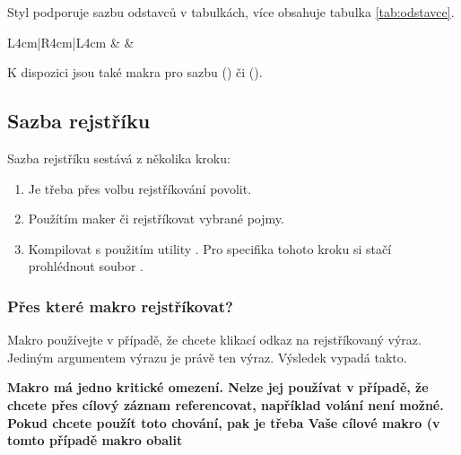 \documentclass[
  master=false,               %
  font=sans,                  %
  printversion=false,         %
  joinlists=true,             %
  glossaries=true,            %
  figures=true,               %
  tables=true,                %
  sourcecodes=true,					  %
  theorems=true,						  %
  bibencoding=utf8,           %
  language=czech,             %
  encoding=utf8,              %
  field=inf,                  %
  index=true,                 %
]{updiplom}
\begin{document}
Styl podporuje sazbu odstavců v tabulkách, více obsahuje tabulka \ref{tab:odstavce}.

\begin{table}
\begin{center}
\caption{Seznam přepínačů}\label{tab:odstavce}
\begin{tabular}{L{4cm}|R{4cm}|L{4cm}}
\lipsum[23] & \lipsum[22] & \lipsum[21]
\end{tabular}
\end{center}
\end{table}

K dispozici jsou také makra pro sazbu \csharp{} () či \cpp{} ().

\subsection{Sazba rejstříku}
Sazba rejstříku sestává z několika kroku:

\begin{enumerate}
\item Je třeba přes volbu  rejstříkování povolit.
\item Použítím maker  či  rejstříkovat vybrané pojmy.
\item Kompilovat s použitím utility . Pro specifika tohoto kroku si stačí prohlédnout soubor .
\end{enumerate}

\subsubsection{Přes které makro rejstříkovat?}
Makro  používejte v případě, že chcete klikací odkaz na rejstříkovaný výraz. Jediným argumentem výrazu je právě ten výraz. Výsledek vypadá takto.

\textbf{Makro  má jedno kritické omezení. Nelze jej používat v případě, že chcete přes cílový záznam referencovat, například volání  není možné. Pokud chcete použít toto chování, pak je třeba Vaše cílové makro (v tomto případě makro  obalit }
\end{document}
